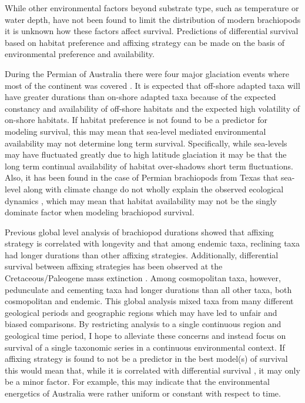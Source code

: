 \documentclass[12pt,letterpaper]{article}
\begin{document}
While other environmental factors beyond substrate type, such as temperature or water depth, have not been found to limit the distribution of modern brachiopods \citep{Richardson1997,Richardson1997a} it is unknown how these factors affect survival. Predictions of differential survival based on habitat preference and affixing strategy can be made on the basis of environmental preference and availability.

During the Permian of Australia there were four major glaciation events where most of the continent was covered \citep{Fielding2008,Birgenheier2010,Fielding2008a,Fielding2006}. It is expected that off-shore adapted taxa will have greater durations than on-shore adapted taxa because of the expected constancy and availability of off-shore habitats and the expected high volatility of on-shore habitats. If habitat preference is not found to be a predictor for modeling survival, this may mean that sea-level mediated environmental availability may not determine long term survival. Specifically, while sea-levels may have fluctuated greatly due to high latitude glaciation \citep{Fielding2008,Fielding2008a,Birgenheier2010} it may be that the long term continual availability of habitat over-shadows short term fluctuations. Also, it has been found in the case of Permian brachiopods from Texas that sea-level along with climate change do not wholly explain the observed ecological dynamics \citep{Olszewski2004}, which may mean that habitat availability may not be the singly dominate factor when modeling brachiopod survival. 

Previous global level analysis of brachiopod durations showed that affixing strategy is correlated with longevity \citep{Alexander1977} and that among endemic taxa, reclining taxa had longer durations than other affixing strategies. Additionally, differential survival between affixing strategies has been observed at the Cretaceous/Paleogene mass extinction \citep{Johansen1989}. Among cosmopolitan taxa, however, pedunculate and cementing taxa had longer durations than all other taxa, both cosmopolitan and endemic. This global analysis mixed taxa from many different geological periods and geographic regions which may have led to unfair and biased comparisons. By restricting analysis to a single continuous region and geological time period, I hope to alleviate these concerns and instead focus on survival of a single taxonomic series in a continuous environmental context.  If affixing strategy is found to not be a predictor in the best model(s) of survival this would mean that, while it is correlated with differential survival \citep{Alexander1977,Johansen1989}, it may only be a minor factor. For example, this may indicate that the environmental energetics of Australia were rather uniform or constant with respect to time.
\end{document}
